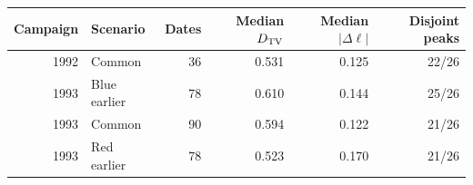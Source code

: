 \begin{tabular}{rlrrrr}
\toprule
Campaign & Scenario & Dates & Median $D_{\rm TV}$ & Median $|\Delta\ell|$ & Disjoint peaks \\
\midrule
1992 & Common & 36 & 0.531 & 0.125 & 22/26 \\
1993 & Blue earlier & 78 & 0.610 & 0.144 & 25/26 \\
1993 & Common & 90 & 0.594 & 0.122 & 21/26 \\
1993 & Red earlier & 78 & 0.523 & 0.170 & 21/26 \\
\bottomrule
\end{tabular}

